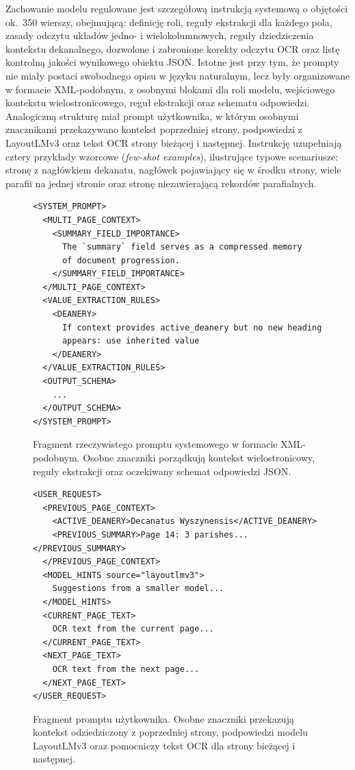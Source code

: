 Zachowanie modelu regulowane jest szczegółową instrukcją systemową o objętości ok.\ 350 wierszy, obejmującą: definicję roli, reguły ekstrakcji dla każdego pola, zasady odczytu układów jedno- i wielokolumnowych, reguły dziedziczenia kontekstu dekanalnego, dozwolone i zabronione korekty odczytu OCR oraz listę kontrolną jakości wynikowego obiektu JSON\@.
Istotne jest przy tym, że prompty nie miały postaci swobodnego opisu w języku naturalnym, lecz były organizowane w formacie XML-podobnym, z osobnymi blokami dla roli modelu, wejściowego kontekstu wielostronicowego, reguł ekstrakcji oraz schematu odpowiedzi.
Analogiczną strukturę miał prompt użytkownika, w którym osobnymi znacznikami przekazywano kontekst poprzedniej strony, podpowiedzi z LayoutLMv3 oraz tekst OCR strony bieżącej i następnej.
Instrukcję uzupełniają cztery przykłady wzorcowe (\textit{few-shot examples}), ilustrujące typowe scenariusze: stronę z nagłówkiem dekanatu, nagłówek pojawiający się w środku strony, wiele parafii na jednej stronie oraz stronę niezawierającą rekordów parafialnych.

\begin{figure}[htbp]
\centering
\begin{minipage}{0.93\textwidth}
\begin{lstlisting}
<SYSTEM_PROMPT>
  <MULTI_PAGE_CONTEXT>
    <SUMMARY_FIELD_IMPORTANCE>
      The `summary` field serves as a compressed memory
      of document progression.
    </SUMMARY_FIELD_IMPORTANCE>
  </MULTI_PAGE_CONTEXT>
  <VALUE_EXTRACTION_RULES>
    <DEANERY>
      If context provides active_deanery but no new heading
      appears: use inherited value
    </DEANERY>
  </VALUE_EXTRACTION_RULES>
  <OUTPUT_SCHEMA>
    ...
  </OUTPUT_SCHEMA>
</SYSTEM_PROMPT>
\end{lstlisting}
\end{minipage}
\caption{Fragment rzeczywistego promptu systemowego w formacie XML-podobnym. Osobne znaczniki porządkują kontekst wielostronicowy, reguły ekstrakcji oraz oczekiwany schemat odpowiedzi JSON.}
\label{fig:xml-prompt-fragment}
\end{figure}

\begin{figure}[htbp]
\centering
\begin{minipage}{0.93\textwidth}
\begin{lstlisting}
<USER_REQUEST>
  <PREVIOUS_PAGE_CONTEXT>
    <ACTIVE_DEANERY>Decanatus Wyszynensis</ACTIVE_DEANERY>
    <PREVIOUS_SUMMARY>Page 14: 3 parishes...</PREVIOUS_SUMMARY>
  </PREVIOUS_PAGE_CONTEXT>
  <MODEL_HINTS source="layoutlmv3">
    Suggestions from a smaller model...
  </MODEL_HINTS>
  <CURRENT_PAGE_TEXT>
    OCR text from the current page...
  </CURRENT_PAGE_TEXT>
  <NEXT_PAGE_TEXT>
    OCR text from the next page...
  </NEXT_PAGE_TEXT>
</USER_REQUEST>
\end{lstlisting}
\end{minipage}
\caption{Fragment promptu użytkownika. Osobne znaczniki przekazują kontekst odziedziczony z poprzedniej strony, podpowiedzi modelu LayoutLMv3 oraz pomocniczy tekst OCR dla strony bieżącej i następnej.}
\label{fig:xml-user-prompt-fragment}
\end{figure}

